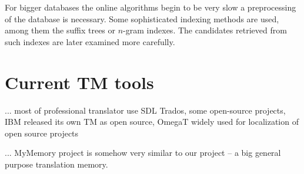 For bigger databases the online algorithms begin to be very slow a preprocessing of the database is necessary. Some sophisticated indexing methods are used, among them the suffix trees or $n$-gram indexes. The candidates retrieved from such indexes are later examined more carefully.

\section{Current TM tools}

... most of professional translator use SDL Trados, some open-source projects, IBM released its own TM as open source, OmegaT widely used for localization of open source projects

... MyMemory project is somehow very similar to our project -- a big general purpose translation memory. 